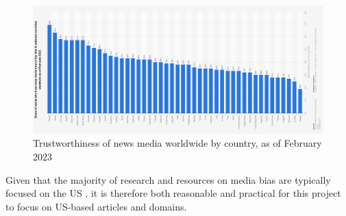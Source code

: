 \begin{figure}[htbp]
    \centering
    \includegraphics[width=1\linewidth]{images/statistic_id308468_trustworthiness-of-news-media-worldwide-2023.png}
    \caption{Trustworthiness of news media worldwide by country, as of February 2023 \cite{reuters-2023-trust}}
    \label{fig:trustworthiness-of-news-media-worldwide-2023}
\end{figure}

Given that the majority of research and resources on media bias are typically focused on the US \cite{allsides, adfontes,rodrigo-2024-systematic-review-media-bias}, it is therefore both reasonable and practical for this project to focus on US-based articles and domains.





